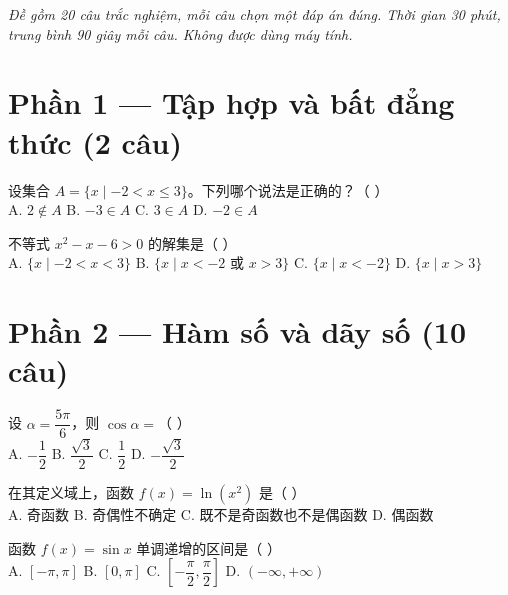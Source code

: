 \documentclass[11pt, a4paper]{article}
\begin{document}

\vspace{0.2cm}
\noindent\emph{Đề gồm 20 câu trắc nghiệm, mỗi câu chọn một đáp án đúng. Thời gian 30 phút, trung bình 90 giây mỗi câu. Không được dùng máy tính.}

\vspace{0.1cm}
\section*{Phần 1 — Tập hợp và bất đẳng thức (2 câu)}

\begin{baitap}[1]
设集合 $A=\{x \mid -2<x\le 3\}$。下列哪个说法是正确的？（ ）\\[4pt]
A. $2\notin A$ \quad B. $-3\in A$ \quad C. $3\in A$ \quad D. $-2\in A$
\end{baitap}

\begin{baitap}[2]
不等式 $x^2-x-6>0$ 的解集是（ ）\\[4pt]
A. $\{x \mid -2<x<3\}$ \quad B. $\{x \mid x<-2 \text{ 或 } x>3\}$ \quad C. $\{x \mid x<-2\}$ \quad D. $\{x \mid x>3\}$
\end{baitap}

\section*{Phần 2 — Hàm số và dãy số (10 câu)}

\begin{baitap}[3]
设 $\alpha=\dfrac{5\pi}{6}$，则 $\cos\alpha=$（ ）\\[4pt]
A. $-\dfrac{1}{2}$ \quad B. $\dfrac{\sqrt{3}}{2}$ \quad C. $\dfrac{1}{2}$ \quad D. $-\dfrac{\sqrt{3}}{2}$
\end{baitap}

\begin{baitap}[4]
在其定义域上，函数 $f(x)=\ln(x^2)$ 是（ ）\\[4pt]
A. 奇函数 \quad B. 奇偶性不确定 \quad C. 既不是奇函数也不是偶函数 \quad D. 偶函数
\end{baitap}

\begin{baitap}[5]
函数 $f(x)=\sin x$ 单调递增的区间是（ ）\\[4pt]
A. $[-\pi,\pi]$ \quad B. $[0,\pi]$ \quad C. $\left[-\dfrac{\pi}{2},\dfrac{\pi}{2}\right]$ \quad D. $(-\infty,+\infty)$
\end{baitap}
\end{document}
